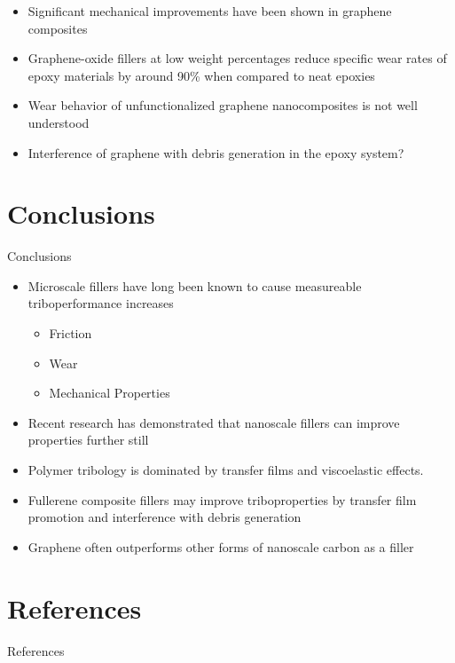 \documentclass[12pt,letterpaper]{beamer}
\begin{document}
\begin{frame}
\begin{itemize}
\item Significant mechanical improvements have been shown in graphene composites 

\item Graphene-oxide fillers at low weight percentages reduce specific wear rates of epoxy materials by around 90\% when compared to neat epoxies \cite{shen_significantly_2013,li2013control} \item Wear behavior of unfunctionalized graphene nanocomposites is not well understood
\item Interference of graphene with debris generation in the epoxy system?
\end{itemize}
\end{frame}

\section{Conclusions}

\begin{frame}{Conclusions}
\begin{itemize}
\item Microscale fillers have long been known to cause measureable triboperformance increases
\begin{itemize}
\item Friction
\item Wear
\item Mechanical Properties
\end{itemize}

\item Recent research has demonstrated that nanoscale fillers can improve properties further still

\item Polymer tribology is dominated by transfer films and viscoelastic effects.

\item Fullerene composite fillers may improve triboproperties by transfer film promotion and interference with debris generation

\item Graphene often outperforms other forms of nanoscale carbon as a filler
\end{itemize}
\end{frame}

\section{References}
\begin{frame}[allowframebreaks]{References}

\end{frame}
\end{document}
